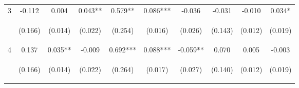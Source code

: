 \begin{tabular}{lccccccccc}
\noalign{\smallskip}3 & -0.112 & 0.004 & 0.043** & 0.579** & 0.086*** & -0.036 & -0.031 & -0.010 & 0.034*\\
 & \begin{footnotesize}(0.166)\end{footnotesize} & \begin{footnotesize}(0.014)\end{footnotesize} & \begin{footnotesize}(0.022)\end{footnotesize} & \begin{footnotesize}(0.254)\end{footnotesize} & \begin{footnotesize}(0.016)\end{footnotesize} & \begin{footnotesize}(0.026)\end{footnotesize} & \begin{footnotesize}(0.143)\end{footnotesize} & \begin{footnotesize}(0.012)\end{footnotesize} & \begin{footnotesize}(0.019)\end{footnotesize}\\
\noalign{\smallskip}4 & 0.137 & 0.035** & -0.009 & 0.692*** & 0.088*** & -0.059** & 0.070 & 0.005 & -0.003\\
 & \begin{footnotesize}(0.166)\end{footnotesize} & \begin{footnotesize}(0.014)\end{footnotesize} & \begin{footnotesize}(0.022)\end{footnotesize} & \begin{footnotesize}(0.264)\end{footnotesize} & \begin{footnotesize}(0.017)\end{footnotesize} & \begin{footnotesize}(0.027)\end{footnotesize} & \begin{footnotesize}(0.140)\end{footnotesize} & \begin{footnotesize}(0.012)\end{footnotesize} & \begin{footnotesize}(0.019)\end{footnotesize}\\

\end{tabular}
